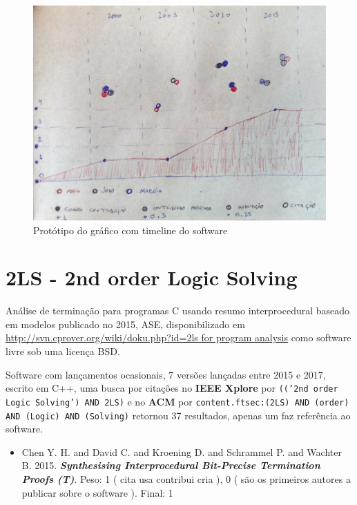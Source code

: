 

\label{softwares-summary}

\begin{figure}[h]
  \center
  \includegraphics[scale=0.35]{imagens/software-timeline-wireframe.jpg}
  \caption{Protótipo do gráfico com timeline do software}
\end{figure}

\section{2LS - 2nd order Logic Solving}

Análise de terminação para programas C usando resumo interprocedural baseado em modelos
publicado no 2015, ASE,
disponibilizado em \url{http://svn.cprover.org/wiki/doku.php?id=2ls for program analysis}
como software livre
sob uma licença BSD.

Software com lançamentos ocasionais,
7 versões lançadas
entre 2015 e 2017,
escrito em C++,
uma busca por citações no {\bf IEEE Xplore} por
\texttt{(('2nd order Logic Solving') AND 2LS)}
e no {\bf ACM} por
\texttt{content.ftsec:(2LS) AND (order) AND (Logic) AND (Solving)}
retornou
37 resultados,
apenas um faz referência ao software.

\begin{itemize}
\item Chen Y. H. and David C. and Kroening D. and Schrammel P. and Wachter B.
      2015.
        \textbf{\textit{ Synthesising Interprocedural Bit-Precise Termination Proofs (T)}}.
      Peso:
      1 (
          cita
          usa
          contribui
          cria
      ),
      0 (
são os primeiros autores a publicar sobre o software
      ).
      Final:
      1

\end{itemize}


